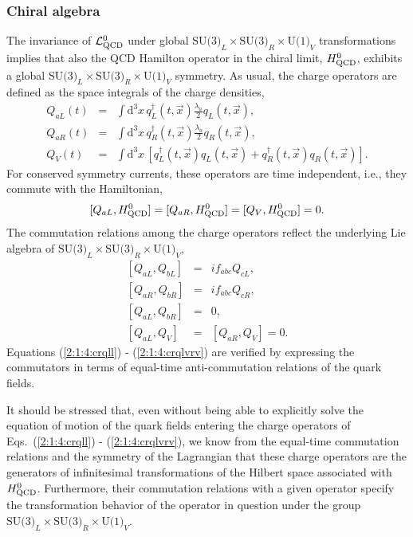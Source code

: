 \documentclass[twoside,12pt]{article}
\begin{document}
\subsubsection{Chiral algebra}
\label{subsec_ca}
   The invariance of ${\cal L}^0_{\rm QCD}$ under global
$\mbox{SU(3)}_L\times\mbox{SU(3)}_R\times\mbox{U(1)}_V$ transformations
implies that also the QCD Hamilton operator in the chiral limit,
$H^0_{\rm QCD}$, exhibits a global
$\mbox{SU(3)}_L\times\mbox{SU(3)}_R\times\mbox{U(1)}_V$ symmetry.
   As usual, the charge operators are defined as the space integrals
of the charge densities,
\begin{eqnarray}
\label{2:1:4:ql}
Q_{aL}(t)&=&\int \mbox{d}^3x\,q^\dagger_L(t,\vec{x})\frac{\lambda_a}{2}q_L(t,\vec{x}),\\
\label{2:1:4:qr}
Q_{aR}(t)&=&\int \mbox{d}^3x\,q^\dagger_R(t,\vec{x})\frac{\lambda_a}{2}q_R(t,\vec{x}),\\
\label{2:1:4:qv}
Q_V(t)&=&\int \mbox{d}^3x\,\left[q^\dagger_L(t,\vec{x})q_L(t,\vec{x})+
q^\dagger_R(t,\vec{x})q_R(t,\vec{x})\right].
\end{eqnarray}
   For conserved symmetry currents, these operators are time independent,
i.e., they commute with the Hamiltonian,
\begin{equation}
\label{2:1:4:vrhq} [Q_{aL},H^0_{\rm QCD}]=[Q_{aR},H^0_{\rm
QCD}]=[Q_V,H^0_{\rm QCD}]=0.
\end{equation}
The commutation relations among the charge operators reflect the underlying Lie algebra
of $\mbox{SU(3)}_L\times\mbox{SU(3)}_R\times\mbox{U(1)}_V$,
\begin{eqnarray}
\label{2:1:4:crqll}
[Q_{aL},Q_{bL}]&=&if_{abc}Q_{cL},\\
\label{2:1:4:crqrr}
{[Q_{aR},Q_{bR}]}&=&if_{abc}Q_{cR},\\
\label{2:1:4:crqlr}
{[Q_{aL},Q_{bR}]}&=&0,\\
\label{2:1:4:crqlvrv} {[Q_{aL},Q_V]}&=&[Q_{aR},Q_V]=0.
\end{eqnarray}
   Equations (\ref{2:1:4:crqll}) - (\ref{2:1:4:crqlvrv}) are verified by expressing the
commutators in terms of equal-time anti-commutation relations of the
quark fields.

  It should be stressed that, even without being able to explicitly solve
the equation of motion of the quark fields entering the charge
operators of Eqs.\ (\ref{2:1:4:crqll}) - (\ref{2:1:4:crqlvrv}), we
know from the equal-time commutation relations and the symmetry of
the Lagrangian that these charge operators are the generators of
infinitesimal transformations of the Hilbert space associated with
$H^0_{\rm QCD}$.
   Furthermore, their commutation relations with a given operator
specify the transformation behavior of the operator in question
under the group $\mbox{SU(3)}_L\times\mbox{SU(3)}_R\times\mbox{U(1)}_V$.
\end{document}
